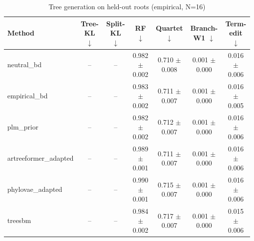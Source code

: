 \begin{table}[t]\centering
\caption{Tree generation on held-out roots (empirical, N=16)}
\begin{tabular}{lcccccc}
\toprule
Method & Tree-KL $\downarrow$ & Split-KL $\downarrow$ & RF $\downarrow$ & Quartet $\downarrow$ & Branch-W1 $\downarrow$ & Term-edit $\downarrow$ \\
\midrule
neutral\_bd & -- & -- & 0.982 $\pm$ 0.002 & 0.710 $\pm$ 0.008 & 0.001 $\pm$ 0.000 & 0.016 $\pm$ 0.006 \\
empirical\_bd & -- & -- & 0.983 $\pm$ 0.002 & 0.711 $\pm$ 0.007 & 0.001 $\pm$ 0.000 & 0.016 $\pm$ 0.005 \\
plm\_prior & -- & -- & 0.982 $\pm$ 0.002 & 0.712 $\pm$ 0.007 & 0.001 $\pm$ 0.000 & 0.016 $\pm$ 0.006 \\
artreeformer\_adapted & -- & -- & 0.989 $\pm$ 0.001 & 0.711 $\pm$ 0.007 & 0.001 $\pm$ 0.000 & 0.016 $\pm$ 0.006 \\
phylovae\_adapted & -- & -- & 0.990 $\pm$ 0.001 & 0.715 $\pm$ 0.007 & 0.001 $\pm$ 0.000 & 0.016 $\pm$ 0.006 \\
treesbm & -- & -- & 0.984 $\pm$ 0.002 & 0.717 $\pm$ 0.007 & 0.001 $\pm$ 0.000 & 0.015 $\pm$ 0.006 \\
\bottomrule
\end{tabular}
\end{table}